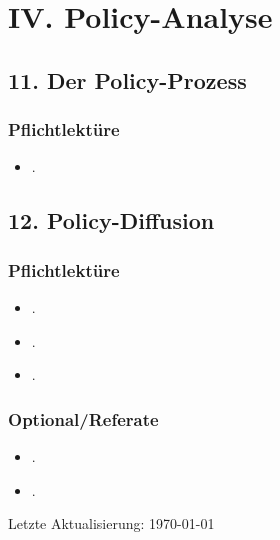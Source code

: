 \documentclass[abstract=on,parskip=full,headings=standardclasses,fontsize=11pt,paper=a4]{scrartcl}
\begin{document}
\section{IV. Policy-Analyse}

\subsection{11. Der Policy-Prozess}

\subsubsection*{Pflichtlektüre}
\begin{itemize}
\item {}.
\end{itemize}
 


\subsection{12. Policy-Diffusion}

\subsubsection*{Pflichtlektüre}
\begin{itemize}
\item {}.
\item {}.
\item {}.
\end{itemize}
 
 
\subsubsection*{Optional/Referate}
\begin{itemize}
\item {}.
 \item {}.
\end{itemize}

 


\sloppy
\renewcommand*{\bibfont}{\small}

\setlength{\bibitemsep}{0.2em} %
\printbibliography

\bigskip

\begin{center}
Letzte Aktualisierung: \today
\end{center}
\end{document}
